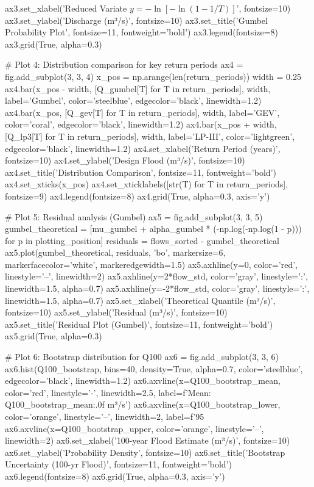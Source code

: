\documentclass[a4paper, 11pt]{article}
\begin{document}
\begin{pycode}
ax3.set_xlabel('Reduced Variate $y = -\ln[-\ln(1-1/T)]$', fontsize=10)
ax3.set_ylabel('Discharge (m³/s)', fontsize=10)
ax3.set_title('Gumbel Probability Plot', fontsize=11, fontweight='bold')
ax3.legend(fontsize=8)
ax3.grid(True, alpha=0.3)

# Plot 4: Distribution comparison for key return periods
ax4 = fig.add_subplot(3, 3, 4)
x_pos = np.arange(len(return_periods))
width = 0.25
ax4.bar(x_pos - width, [Q_gumbel[T] for T in return_periods], width,
        label='Gumbel', color='steelblue', edgecolor='black', linewidth=1.2)
ax4.bar(x_pos, [Q_gev[T] for T in return_periods], width,
        label='GEV', color='coral', edgecolor='black', linewidth=1.2)
ax4.bar(x_pos + width, [Q_lp3[T] for T in return_periods], width,
        label='LP-III', color='lightgreen', edgecolor='black', linewidth=1.2)
ax4.set_xlabel('Return Period (years)', fontsize=10)
ax4.set_ylabel('Design Flood (m³/s)', fontsize=10)
ax4.set_title('Distribution Comparison', fontsize=11, fontweight='bold')
ax4.set_xticks(x_pos)
ax4.set_xticklabels([str(T) for T in return_periods], fontsize=9)
ax4.legend(fontsize=8)
ax4.grid(True, alpha=0.3, axis='y')

# Plot 5: Residual analysis (Gumbel)
ax5 = fig.add_subplot(3, 3, 5)
gumbel_theoretical = [mu_gumbel + alpha_gumbel * (-np.log(-np.log(1 - p)))
                      for p in plotting_position]
residuals = flows_sorted - gumbel_theoretical
ax5.plot(gumbel_theoretical, residuals, 'bo', markersize=6,
         markerfacecolor='white', markeredgewidth=1.5)
ax5.axhline(y=0, color='red', linestyle='--', linewidth=2)
ax5.axhline(y=2*flow_std, color='gray', linestyle=':', linewidth=1.5, alpha=0.7)
ax5.axhline(y=-2*flow_std, color='gray', linestyle=':', linewidth=1.5, alpha=0.7)
ax5.set_xlabel('Theoretical Quantile (m³/s)', fontsize=10)
ax5.set_ylabel('Residual (m³/s)', fontsize=10)
ax5.set_title('Residual Plot (Gumbel)', fontsize=11, fontweight='bold')
ax5.grid(True, alpha=0.3)

# Plot 6: Bootstrap distribution for Q100
ax6 = fig.add_subplot(3, 3, 6)
ax6.hist(Q100_bootstrap, bins=40, density=True, alpha=0.7, color='steelblue',
         edgecolor='black', linewidth=1.2)
ax6.axvline(x=Q100_bootstrap_mean, color='red', linestyle='-', linewidth=2.5,
            label=f'Mean: {Q100_bootstrap_mean:.0f} m³/s')
ax6.axvline(x=Q100_bootstrap_lower, color='orange', linestyle='--', linewidth=2,
            label=f'95%
ax6.axvline(x=Q100_bootstrap_upper, color='orange', linestyle='--', linewidth=2)
ax6.set_xlabel('100-year Flood Estimate (m³/s)', fontsize=10)
ax6.set_ylabel('Probability Density', fontsize=10)
ax6.set_title('Bootstrap Uncertainty (100-yr Flood)', fontsize=11, fontweight='bold')
ax6.legend(fontsize=8)
ax6.grid(True, alpha=0.3, axis='y')


\end{pycode}
\end{document}
